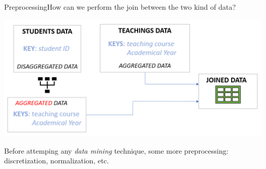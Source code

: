 \begin{frame}{Preprocessing}{How can we perform the join between the two kind of data?}

    \vspace{0.2cm}
    \begin{centering}
        \hspace*{-0.5cm}\includegraphics[scale=0.27]{img8.png}
    \end{centering}

    Before attemping any \emph{data mining} technique, some more preprocessing: discretization, normalization, etc.

\end{frame}